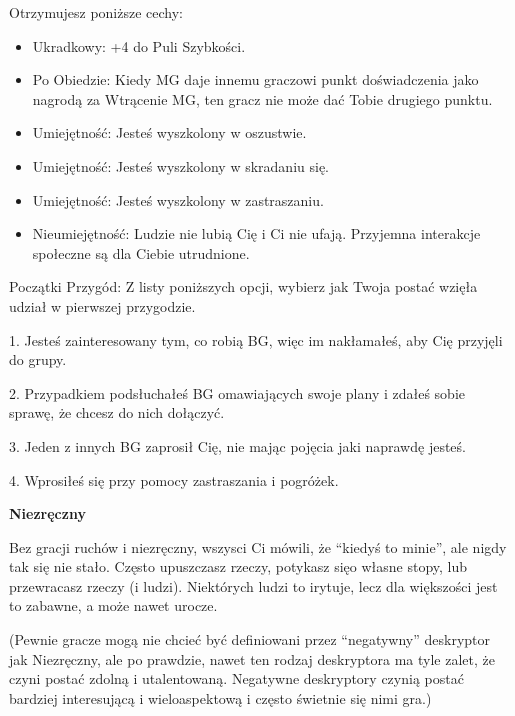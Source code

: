 Otrzymujesz poniższe cechy:
\begin{itemize}
\item  Ukradkowy: +4 do Puli Szybkości.
\item Po Obiedzie: Kiedy MG daje innemu graczowi punkt doświadczenia jako nagrodą za Wtrącenie MG, ten gracz nie może dać Tobie drugiego punktu.
\item  Umiejętność: Jesteś wyszkolony w oszustwie.
\item  Umiejętność: Jesteś wyszkolony w skradaniu się.
\item  Umiejętność: Jesteś wyszkolony w zastraszaniu.
\item  Nieumiejętność: Ludzie nie lubią Cię i Ci nie ufają. Przyjemna interakcje społeczne są dla Ciebie utrudnione. 
 \end{itemize}
    
Początki Przygód: Z listy poniższych opcji, wybierz jak Twoja postać wzięła udział w pierwszej przygodzie.

1. Jesteś zainteresowany tym, co robią BG, więc im nakłamałeś, aby Cię przyjęli do grupy.

2. Przypadkiem podsłuchałeś BG omawiających swoje plany i zdałeś sobie sprawę, że chcesz do nich dołączyć.

3. Jeden z innych BG zaprosił Cię, nie mając pojęcia jaki naprawdę jesteś.

4. Wprosiłeś się przy pomocy zastraszania i pogróżek.

\textbf{Niezręczny}

Bez gracji ruchów i niezręczny, wszysci Ci mówili, że “kiedyś to minie”, ale nigdy tak się nie stało. Często upuszczasz rzeczy, potykasz sięo własne stopy, lub przewracasz rzeczy (i ludzi). Niektórych ludzi to irytuje, lecz dla większości jest to zabawne, a może nawet urocze.

(Pewnie gracze mogą nie chcieć być definiowani przez “negatywny” deskryptor jak Niezręczny, ale po prawdzie, nawet ten rodzaj deskryptora ma tyle zalet, że czyni postać zdolną i utalentowaną. Negatywne deskryptory czynią postać bardziej interesującą i wieloaspektową i często świetnie się nimi gra.)

